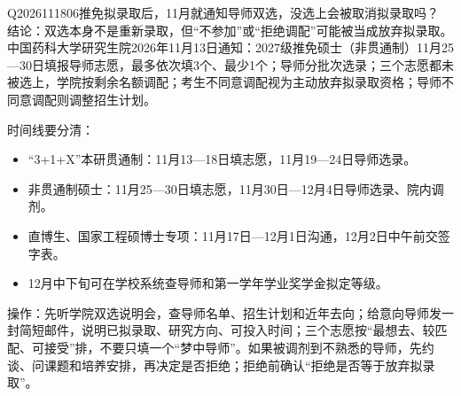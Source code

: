 \begin{qa}{Q2026111806}{推免拟录取后，11月就通知导师双选，没选上会被取消拟录取吗？}
结论：双选本身不是重新录取，但“不参加”或“拒绝调配”可能被当成放弃拟录取。中国药科大学研究生院2026年11月13日通知：2027级推免硕士（非贯通制）11月25—30日填报导师志愿，最多依次填3个、最少1个；导师分批次选录；三个志愿都未被选上，学院按剩余名额调配；考生不同意调配视为主动放弃拟录取资格；导师不同意调配则调整招生计划。

时间线要分清：

\begin{itemize}
\item “3+1+X”本研贯通制：11月13—18日填志愿，11月19—24日导师选录。
\item 非贯通制硕士：11月25—30日填志愿，11月30日—12月4日导师选录、院内调剂。
\item 直博生、国家工程硕博士专项：11月17日—12月1日沟通，12月2日中午前交签字表。
\item 12月中下旬可在学校系统查导师和第一学年学业奖学金拟定等级。
\end{itemize}

操作：先听学院双选说明会，查导师名单、招生计划和近年去向；给意向导师发一封简短邮件，说明已拟录取、研究方向、可投入时间；三个志愿按“最想去、较匹配、可接受”排，不要只填一个“梦中导师”。如果被调剂到不熟悉的导师，先约谈、问课题和培养安排，再决定是否拒绝；拒绝前确认“拒绝是否等于放弃拟录取”。
\end{qa}
